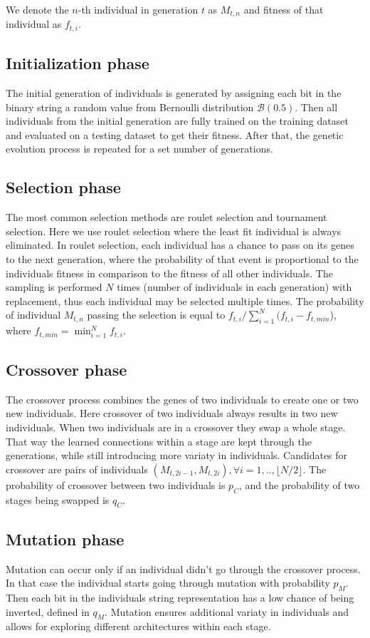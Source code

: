 \documentclass[eng]{simposium}
\begin{document}
We denote the $n$-th individual in generation $t$ as $M_{t,n}$ and fitness of that individual as $f_{t,i}$.

\subsection{Initialization phase}
The initial generation of individuals is generated by assigning each bit in the binary string a random value from Bernoulli distribution $\mathcal{B}(0.5)$.
Then all individuals from the initial generation are fully trained on the training dataset and evaluated on a testing dataset to get their fitness.
After that, the genetic evolution process is repeated for a set number of generations.

\subsection{Selection phase}
The most common selection methods are roulet selection and tournament selection. 
Here we use roulet selection where the least fit individual is always eliminated.
In roulet selection, each individual has a chance to pass on its genes to the next generation, 
where the probability of that event is proportional to the individuals fitness in comparison to the fitness of all other individuals.
The sampling is performed $N$ times (number of individuals in each generation) with replacement, thus each individual may be selected multiple times.
The probability of individual $M_{t,n}$ passing the selection is equal to $f_{t,i} / \sum_{i=1}^{N} (f_{t,i} - f_{t,min}$), where $f_{t, min} = \min_{i=1}^{N} {f_{t,i}}$.

\subsection{Crossover phase}
The crossover process combines the genes of two individuals to create one or two new individuals.
Here crossover of two individuals always results in two new individuals.
When two individuals are in a crossover they swap a whole stage.
That way the learned connections within a stage are kept through the generations, while still introducing more variaty in individuals.
Candidates for crossover are pairs of individuals $(M_{t,2i-1}, M_{t,2i}), \forall i=1,..,\lfloor N/2\rfloor $.
The probability of crossover between two individuals is $p_C$, and the probability of two stages being swapped is $q_C$.

\subsection{Mutation phase}
Mutation can occur only if an individual didn't go through the crossover process.
In that case the individual starts going through mutation with probability $p_M$.
Then each bit in the individuals string representation has a low chance of being inverted, defined in $q_M$.
Mutation ensures additional variaty in individuals and allows for exploring different architectures within each stage.
\end{document}
